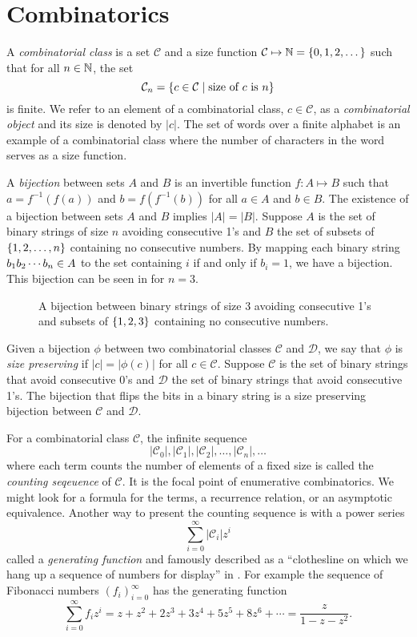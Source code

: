 \label{ch:backgr}
\section{Combinatorics\label{sec:combinatorics}}
A \emph{combinatorial class} is a set $\mathcal{C}$ and a size function $\mathcal{C} \mapsto \mathbb{N} = \left\{0,1,2,\dotsc\right\}$ such that for all $n\in\mathbb{N}$, the set
\[
    \mathcal{C}_n = \left\{c \in \mathcal{C} \mid \text{size of $c$ is $n$}\right\}
\]
is finite. We refer to an element of a combinatorial class, $c\in\mathcal{C}$, as a \emph{combinatorial object} and its size is denoted by $|c|$. The set of words over a finite alphabet is an example of a combinatorial class where the number of characters in the word serves as a size function.

A \emph{bijection} between sets $A$ and $B$ is an invertible function $f: A \mapsto B$ such that $a=f^{-1}(f(a))$ and $b=f(f^{-1}(b))$ for all $a\in A$ and $b \in B$. The existence of a bijection between sets $A$ and $B$ implies $|A|=|B|$. Suppose $A$ is the set of binary strings of size $n$ avoiding consecutive 1's and $B$ the set of subsets of $\left\{1,2,\dotsc,n\right\}$ containing no consecutive numbers. By mapping each binary string $b_1 b_2 \dotsm b_{n} \in A$ to the set containing $i$ if and only if $b_i=1$, we have a bijection. This bijection can be seen in  for $n=3$.

\begin{figure}[htbp]
    \centering
    
    \caption{A bijection between binary strings of size 3 avoiding consecutive 1's and subsets of $\left\{1,2,3\right\}$ containing no consecutive numbers.}
    \label{fig:bijection_example}
\end{figure}

Given a bijection $\phi$ between two combinatorial classes $\mathcal{C}$ and $\mathcal{D}$, we say that $\phi$ is \emph{size preserving} if $|c| = |\phi(c)|$ for all $c\in\mathcal{C}$. Suppose $\mathcal{C}$ is the set of binary strings that avoid consecutive 0's and $\mathcal{D}$ the set of binary strings that avoid consecutive 1's. The bijection that flips the bits in a binary string is a size preserving bijection between $\mathcal{C}$ and $\mathcal{D}$. 

For a combinatorial class $\mathcal{C}$, the infinite sequence 
\[
    |\mathcal{C}_0|, |\mathcal{C}_1|, |\mathcal{C}_2|,\dotsc,|\mathcal{C}_n|,\dotsc
\]
where each term counts the number of elements of a fixed size is called the \emph{counting seqeuence} of $\mathcal{C}$. It is the focal point of enumerative combinatorics. We might look for a formula for the terms, a recurrence relation, or an asymptotic equivalence. Another way to present the counting sequence is with a power series
\[
    \sum_{i=0}^\infty |\mathcal{C}_i|z^i
\]
called a \emph{generating function} and famously described as a ``clothesline on which we hang up a sequence of numbers for display'' in . For example the sequence of Fibonacci numbers $\left(f_i\right)_{i=0}^\infty$ has the generating function
\[
    \sum_{i=0}^\infty f_iz^i =  z + z^2 + 2z^3 + 3z^4 + 5z^5 + 8z^6 + \dotsb = \frac{z}{1-z-z^2}.
\]

